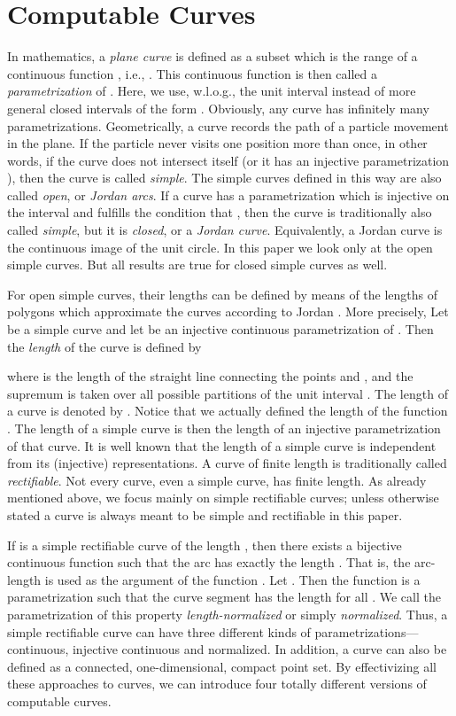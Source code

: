 \documentclass{LMCS}
\theoremstyle{plain}
\begin{document}
\section{Computable Curves}\label{sec-comp-curve}

In mathematics, a {\em plane curve} is defined as a subset  which is the range of a continuous function , i.e., . This continuous function  is then called a {\em parametrization} of . Here, we use, w.l.o.g., the unit interval  instead of more general closed intervals of the form . Obviously, any curve has infinitely many parametrizations. Geometrically, a curve records the path of a particle movement in the plane. If the particle never visits one position more than once, in other words, if the curve does not intersect itself (or it has an injective parametrization ), then the curve is called {\em simple}. The simple curves defined in this way are also called {\em open}, or {\em Jordan arcs}. If a curve  has a parametrization  which is injective on the interval  and fulfills the condition that , then the curve  is traditionally also called {\em simple}, but it is {\em closed}, or a {\em Jordan curve}. Equivalently, a Jordan curve is the continuous image of the unit circle. In this paper we look only at the open simple curves. But all results are true for closed simple curves as well.

For open simple curves, their lengths can be defined by means of the lengths of polygons which approximate the curves according to Jordan \cite{Jor1882}. More precisely, Let  be a simple curve and let  be an injective continuous parametrization of . Then the {\em length}  of the curve  is defined by

where  is the length of the straight line connecting the points  and , and the supremum is taken over all possible partitions  of the unit interval . The length of a curve  is denoted by . Notice that we actually defined the length  of the function . The length of a simple curve is then the length of an injective parametrization of that curve. It is well known that the length of a simple curve is independent from its (injective) representations.  A curve of finite length is traditionally called {\em rectifiable}. Not every curve, even a simple curve,  has finite length. As already mentioned above, we focus mainly on simple rectifiable curves; unless otherwise stated a curve is always meant to be simple and rectifiable in this paper.

If  is a simple rectifiable curve of the length , then there exists a bijective continuous function  such that the arc  has exactly the length . That is, the arc-length  is used as the argument of the function . Let . Then the function  is a parametrization such that the curve segment  has the length  for all . We call the parametrization  of this property {\em length-normalized} or simply {\em normalized}.  Thus, a simple rectifiable curve can have three different kinds of parametrizations---continuous, injective continuous and normalized. In addition, a curve can also be defined as a connected, one-dimensional, compact point set. By effectivizing  all these approaches to curves, we can introduce four totally different versions of computable curves.
\end{document}
